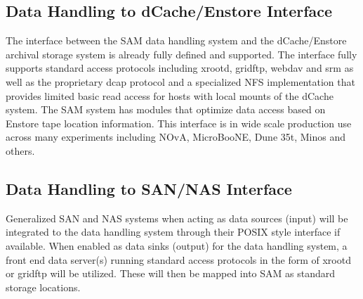 \documentclass[pdftex,12pt,letter]{article}
\begin{document}
\subsection{Data Handling to dCache/Enstore Interface}
The interface between the SAM data handling system and the dCache/Enstore archival storage system is already fully defined and supported.  The interface fully supports standard access protocols including xrootd, gridftp, webdav and srm as well as the proprietary dcap protocol and a specialized NFS implementation that provides limited basic read access for hosts with local mounts of the dCache system. The SAM system has modules that optimize data access based on Enstore tape location information.  This interface is in wide scale production use across many experiments including NOvA, MicroBooNE, Dune 35t, Minos and others.

\subsection{Data Handling to SAN/NAS Interface}
Generalized SAN and NAS systems when acting as data sources (input) will be integrated to the data handling system through their POSIX style interface if available.  When enabled as data sinks (output) for the data handling system, a front end data server(s) running standard access protocols in the form of xrootd or gridftp will be utilized.  These will then be mapped into SAM as standard storage locations.
  
\end{document}
